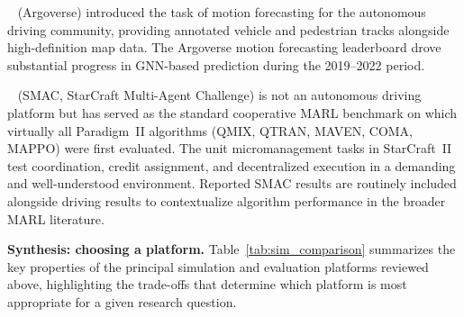 \documentclass[12pt, a4paper]{article}
\begin{document}
\citeauthor{chang2019argoverse}~\cite{chang2019argoverse} (Argoverse) introduced
the task of motion forecasting for the autonomous driving community, providing
annotated vehicle and pedestrian tracks alongside high-definition map data.
The Argoverse motion forecasting leaderboard drove substantial progress in
GNN-based prediction during the 2019--2022 period.

\citeauthor{samvelyan2019starcraft}~\cite{samvelyan2019starcraft} (SMAC,
StarCraft Multi-Agent Challenge) is not an autonomous driving platform but
has served as the standard cooperative MARL benchmark on which virtually all
Paradigm~II algorithms (QMIX, QTRAN, MAVEN, COMA, MAPPO) were first evaluated.
The unit micromanagement tasks in StarCraft~II test coordination, credit
assignment, and decentralized execution in a demanding and well-understood
environment.  Reported SMAC results are routinely included alongside driving
results to contextualize algorithm performance in the broader MARL literature.

\smallskip\noindent\textbf{Synthesis: choosing a platform.}
Table~\ref{tab:sim_comparison} summarizes the key properties of the principal
simulation and evaluation platforms reviewed above, highlighting the trade-offs
that determine which platform is most appropriate for a given research question.
\end{document}
